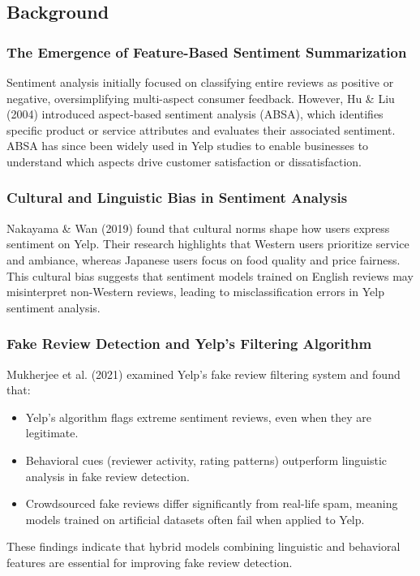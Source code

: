 \documentclass{article}
\begin{document}
\subsection{Background}

\subsubsection{The Emergence of Feature-Based Sentiment Summarization}
Sentiment analysis initially focused on classifying entire reviews as positive or negative, oversimplifying multi-aspect consumer feedback. However, Hu \& Liu (2004) \cite{HuLiu2004} introduced aspect-based sentiment analysis (ABSA), which identifies specific product or service attributes and evaluates their associated sentiment. ABSA has since been widely used in Yelp studies to enable businesses to understand which aspects drive customer satisfaction or dissatisfaction.

\subsubsection{Cultural and Linguistic Bias in Sentiment Analysis}
Nakayama \& Wan (2019) \cite{NakayamaWan2019} found that cultural norms shape how users express sentiment on Yelp. Their research highlights that Western users prioritize service and ambiance, whereas Japanese users focus on food quality and price fairness. This cultural bias suggests that sentiment models trained on English reviews may misinterpret non-Western reviews, leading to misclassification errors in Yelp sentiment analysis.

\subsubsection{Fake Review Detection and Yelp's Filtering Algorithm}
Mukherjee et al. (2021) \cite{Mukherjee2021} examined Yelp’s fake review filtering system and found that:
\begin{itemize}
    \item Yelp’s algorithm flags extreme sentiment reviews, even when they are legitimate.
    \item Behavioral cues (reviewer activity, rating patterns) outperform linguistic analysis in fake review detection.
    \item Crowdsourced fake reviews differ significantly from real-life spam, meaning models trained on artificial datasets often fail when applied to Yelp.
\end{itemize}
These findings indicate that hybrid models combining linguistic and behavioral features are essential for improving fake review detection.
\end{document}
